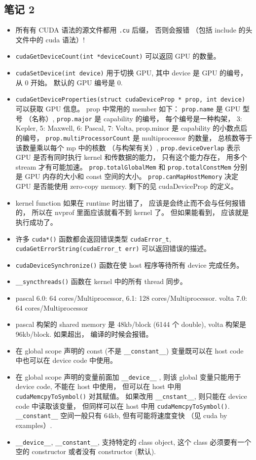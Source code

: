 \subsection{笔记 2}
\begin{itemize}
\item 所有有 CUDA 语法的源文件都用 \verb`.cu` 后缀， 否则会报错 （包括 include 的头文件中的 cuda 语法）!
\item \verb`cudaGetDeviceCount(int *deviceCount)` 可以返回 GPU 的数量。
\item \verb`cudaSetDevice(int device)` 用于切换 GPU, 其中 device 是 GPU 的编号， 从 0 开始。 默认的 GPU 编号是 0.
\item \verb`cudaGetDeviceProperties(struct cudaDeviceProp * prop, int device)` 可以获取 GPU 信息。 prop 中常用的 member 如下：
\verb`prop.name` 是 GPU 型号 （名称）, \verb`prop.major` 是 capability 的编号， 每个编号是一种构架， 3: Kepler,  5: Maxwell, 6: Pascal, 7: Volta, prop.minor 是 capability 的小数点后的编号， \verb`prop.multiProcessorCount` 是 multiprocessor 的数量， 总核数等于该数量乘以每个 mp 中的核数 （与构架有关）, \verb`prop.deviceOverlap` 表示 GPU 是否有同时执行 kernel 和传数据的能力， 只有这个能力存在， 用多个 stream 才有可能加速。
\verb`prop.totalGlobalMem` 和 \verb`prop.totalConstMem` 分别是 GPU 内存的大小和 const 空间的大小。 \verb`prop.canMapHostMemory` 决定 GPU 是否能使用 zero-copy memory. 剩下的见 cudaDeviceProp 的定义。
\item kernel function 如果在 runtime 时出错了， 应该是会终止而不会与任何报错的， 所以在 nvprof 里面应该就看不到 kernel 了。 但如果能看到， 应该就是执行成功了。
\item 许多 \verb`cuda*()` 函数都会返回错误类型 \verb`cudaError_t`, \verb`cudaGetErrorString(cudaError_t err)` 可以返回错误的描述。
\item \verb`cudaDeviceSynchronize()` 函数在使 host 程序等待所有 device 完成任务。
\item \verb`__syncthreads()` 函数在 kernel 中的所有 thread 同步。
\item pascal 6.0: 64 cores/Multiprocessor, 6.1: 128 cores/Multiprocessor.   volta 7.0: 64 cores/Multiprocessor
\item pascal 构架的 shared memory 是 48kb/block (6144 个 double), volta 构架是 96kb/block. 如果超出， 编译的时候会报错。
\item 在 global scope 声明的 const (不是 \verb`__constant__`) 变量既可以在 host code 中也可以在 device code 中使用。
\item 在 global scope 声明的变量前面加 \verb`__device__` , 则该 global 变量只能用于 device code, 不能在 host 中使用， 但可以在 host 中用 \verb`cudaMemcpyToSymbol()` 对其赋值。 如果改用 \verb`__cnstant__`, 则只能在 device code 中读取该变量， 但同样可以在 host 中用 \verb`cudaMemcpyToSymbol()`. \verb`__constant__` 空间一般只有 64kb, 但有可能将速度变快 （见 cuda by examples）.
\item \verb`__device__`, \verb`__constant__`, 支持特定的 class object, 这个 class 必须要有一个空的 constructor 或者没有 constructor (默认).


\end{itemize}

